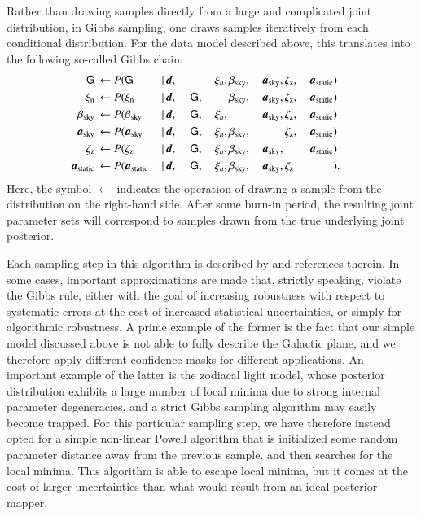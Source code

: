 \documentclass{aa}
\newcommand{\dv}[0]{\vec{d}}
\newcommand{\G}[0]{\tens{G}}
\renewcommand{\a}[0]{\vec{a}}
\begin{document}
Rather than drawing samples
directly from a large and complicated joint distribution, in Gibbs sampling, one
draws samples iteratively from each conditional distribution. For the
data model described above, this translates into the following
so-called Gibbs chain:
\begin{alignat}{11}
\G &\,\leftarrow P(\G&\,\mid &\,\dv,&\, &\,\phantom{\G} &\,\xi_n, &
\,\beta_{\mathrm{sky}},& \,\a_{\mathrm{sky}}, &\,\zeta_{\mathrm{z}},
&\,\a_{\mathrm{static}})\label{eq:gibbs_G}\\
\xi_{\mathrm{n}} &\,\leftarrow P(\xi_{\mathrm{n}}&\,\mid &\,\dv,&\, &\,\G, &\,\phantom{\xi_n} &
\,\beta_{\mathrm{sky}},& \,\a_{\mathrm{sky}}, &\,\zeta_{\mathrm{z}},
&\,\a_{\mathrm{static}})\\
\beta_{\mathrm{sky}} &\,\leftarrow P(\beta_{\mathrm{sky}}&\,\mid &\,\dv,&\, &\,\G, &\,\xi_n, &
\,\phantom{\beta_{\mathrm{sky}}}& \,\a_{\mathrm{sky}}, &\,\zeta_{\mathrm{z}}, &\,\a_{\mathrm{static}})\\
\a_{\mathrm{sky}} &\,\leftarrow P(\a_{\mathrm{sky}}&\,\mid &\,\dv,&\, &\,\G, &\,\xi_n, &
\,\beta_{\mathrm{sky}},& \,\phantom{\a_{\mathrm{sky}},}
&\,\zeta_{\mathrm{z}}, &\,\a_{\mathrm{static}})\\
\zeta_{\mathrm{z}} &\,\leftarrow P(\zeta_{\mathrm{z}}&\,\mid &\,\dv,&\, &\,\G, &\,\xi_n, &
\,\beta_{\mathrm{sky}},& \,\a_{\mathrm{sky}},
&\,\phantom{\zeta_{\mathrm{z}},} &\,\a_{\mathrm{static}})\label{eq:gibbs_zodi}\\
\a_{\mathrm{static}} &\,\leftarrow P(\a_{\mathrm{static}}&\,\mid &\,\dv,&\, &\,\G, &\,\xi_n, &
\,\beta_{\mathrm{sky}},& \,\a_{\mathrm{sky}}, &\,\zeta_{\mathrm{z}} &\,\phantom{\a_{\mathrm{static}}})\label{eq:gibbs_static}&.
\end{alignat}
Here, the symbol $\leftarrow$ indicates the operation of drawing a
sample from the distribution on the right-hand side. After some
burn-in period, the resulting joint parameter sets will correspond to
samples drawn from the true underlying joint posterior.


Each sampling step in this algorithm is described by \citet{CG02_01}
and references therein. In some cases, important 
approximations are made that, strictly speaking, violate the Gibbs
rule, either with the goal of increasing robustness with respect to
systematic errors at the cost of increased statistical uncertainties,
or simply for algorithmic robustness. A prime example of the former is
the fact that our simple model discussed above is not able to fully
describe the Galactic plane, and we therefore apply different
confidence masks for different applications. An important example of
the latter is the zodiacal light model, whose posterior distribution
exhibits a large number of local minima due to strong internal
parameter degeneracies, and a strict Gibbs sampling algorithm may
easily become trapped. For this particular sampling step, we have
therefore instead opted for a simple non-linear Powell algorithm that
is initialized some random parameter distance away from the previous
sample, and then searches for the local minima. This algorithm is
able to escape local minima, but it comes at the cost of larger
uncertainties than what would result from an ideal posterior mapper.
\end{document}
